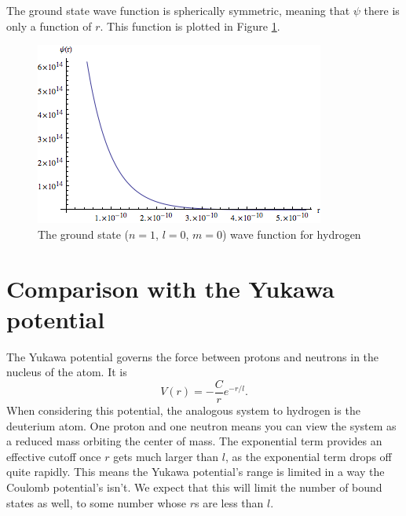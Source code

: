 \documentclass[12pt,twoside]{reedthesis}
\newcommand{\eqn}[1]{\begin{equation}#1\end{equation}}
\begin{document}
The ground state wave function is spherically symmetric, meaning that $\psi$ there is only a function of $r$. This function is plotted in Figure \ref{fig:hground}.

\begin{figure}
\includegraphics[scale=0.75]{hydground.png}
\caption{The ground state ($n=1$, $l =0$, $m= 0$) wave function for hydrogen}
\label{fig:hground}
\end{figure}

\section{Comparison with the Yukawa potential}
The Yukawa potential governs the force between protons and neutrons in the nucleus of the atom. It is
\eqn{
V(r) = -\frac{C}{r}e^{-r/l}\mbox{.}
}
When considering this potential, the analogous system to hydrogen is the deuterium atom. One proton and one neutron means you can view the system as a reduced mass orbiting the center of mass. The exponential term provides an effective cutoff once $r$ gets much larger than $l$, as the exponential term drops off quite rapidly. This means the Yukawa potential's range is limited in a way the Coulomb potential's isn't. We expect that this will limit the number of bound states as well, to some number whose $r$s are less than $l$.
\end{document}
